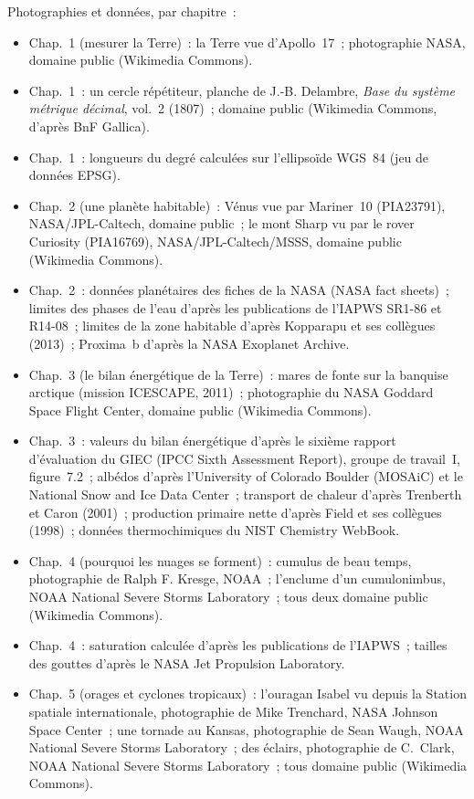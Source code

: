 \bigskip
\noindent Photographies et données, par chapitre~:
\begin{itemize}\small
  \item Chap.~1 (mesurer la Terre)~: la Terre vue d'Apollo~17~; photographie NASA, domaine public (Wikimedia Commons).
  \item Chap.~1~: un cercle répétiteur, planche de J.-B. Delambre, \emph{Base du système métrique décimal}, vol.~2 (1807)~; domaine public (Wikimedia Commons, d'après BnF Gallica).
  \item Chap.~1~: longueurs du degré calculées sur l'ellipsoïde WGS~84 (jeu de données EPSG).
  \item Chap.~2 (une planète habitable)~: Vénus vue par Mariner~10 (PIA23791), NASA/JPL-Caltech, domaine public~; le mont Sharp vu par le rover Curiosity (PIA16769), NASA/JPL-Caltech/MSSS, domaine public (Wikimedia Commons).
  \item Chap.~2~: données planétaires des fiches de la NASA (NASA fact sheets)~; limites des phases de l'eau d'après les publications de l'IAPWS SR1-86 et R14-08~; limites de la zone habitable d'après Kopparapu et ses collègues (2013)~; Proxima~b d'après la NASA Exoplanet Archive.
  \item Chap.~3 (le bilan énergétique de la Terre)~: mares de fonte sur la banquise arctique (mission ICESCAPE, 2011)~; photographie du NASA Goddard Space Flight Center, domaine public (Wikimedia Commons).
  \item Chap.~3~: valeurs du bilan énergétique d'après le sixième rapport d'évaluation du GIEC (IPCC Sixth Assessment Report), groupe de travail~I, figure~7.2~; albédos d'après l'University of Colorado Boulder (MOSAiC) et le National Snow and Ice Data Center~; transport de chaleur d'après Trenberth et Caron (2001)~; production primaire nette d'après Field et ses collègues (1998)~; données thermochimiques du NIST Chemistry WebBook.
  \item Chap.~4 (pourquoi les nuages se forment)~: cumulus de beau temps, photographie de Ralph F. Kresge, NOAA~; l'enclume d'un cumulonimbus, NOAA National Severe Storms Laboratory~; tous deux domaine public (Wikimedia Commons).
  \item Chap.~4~: saturation calculée d'après les publications de l'IAPWS~; tailles des gouttes d'après le NASA Jet Propulsion Laboratory.
  \item Chap.~5 (orages et cyclones tropicaux)~: l'ouragan Isabel vu depuis la Station spatiale internationale, photographie de Mike Trenchard, NASA Johnson Space Center~; une tornade au Kansas, photographie de Sean Waugh, NOAA National Severe Storms Laboratory~; des éclairs, photographie de C.~Clark, NOAA National Severe Storms Laboratory~; tous domaine public (Wikimedia Commons).

\end{itemize}
